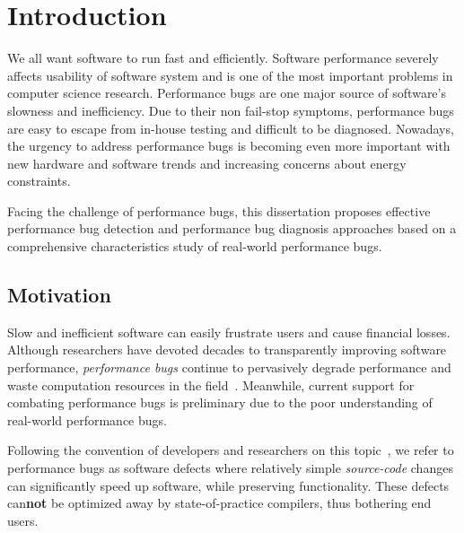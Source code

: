 \chapter[Introduction]{Introduction}
\label{chap:introduction}

We all want software to run fast and efficiently. 
Software performance severely affects usability of software system 
and is one of the most important problems in computer science research. 
Performance bugs are one major source of software's slowness and inefficiency. 
Due to their non fail-stop symptoms, 
performance bugs are easy to escape from in-house testing and difficult to be diagnosed. 
Nowadays, the urgency to address performance bugs is becoming even more important 
with new hardware and software trends and increasing concerns about energy constraints. 

Facing the challenge of performance bugs, 
this dissertation proposes effective performance bug detection 
and performance bug diagnosis approaches based on a 
comprehensive characteristics study of real-world performance bugs.

\section{Motivation}
Slow and inefficient software can easily frustrate users and
cause financial losses.
Although researchers have devoted decades to
transparently improving software performance,
{\it performance bugs} continue to pervasively
degrade performance
and waste computation resources in the field~\citep{rily.perftest}.
Meanwhile, current support for combating performance bugs is preliminary due
to the poor understanding of real-world performance bugs.

Following the convention of developers and researchers 
on this topic~\citep{s2e,perf.fse10,rily.perftest,perfantipattern},
we refer to performance bugs as software defects where
relatively simple {\it source-code} changes can significantly speed up
software, while preserving functionality.
These defects can{\bf not} be optimized away by state-of-practice compilers,
thus bothering end users.

